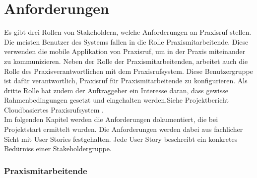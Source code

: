 \section{Anforderungen}\label{sec:anforderungen}

Es gibt drei Rollen von Stakeholdern, welche Anforderungen an Praxisruf stellen.
Die meisten Benutzer des Systems fallen in die Rolle Praxismitarbeitende.
Diese verwenden die mobile Applikation von Praxisruf, um in der Praxis miteinander zu kommunizieren.
Neben der Rolle der Praxismitarbeitenden, arbeitet auch die Rolle des Praxisverantwortlichen mit dem Praxisrufsystem.
Diese Benutzergruppe ist dafür verantwortlich, Praxisruf für Praxismitarbeitende zu konfigurieren.
Als dritte Rolle hat zudem der Auftraggeber ein Interesse daran, dass gewisse Rahmenbedingungen gesetzt und eingehalten werden.{Siehe Projektbericht Cloudbasiertes Praxisrufsystem \cite{ip5}}. \\

Im folgenden Kapitel werden die Anforderungen dokumentiert, die bei Projektstart ermittelt wurden.
Die Anforderungen werden dabei aus fachlicher Sicht mit User Stories festgehalten.
Jede User Story beschreibt ein konkretes Bedürniss einer Stakeholdergruppe.

\subsubsection*{Praxismitarbeitende}

